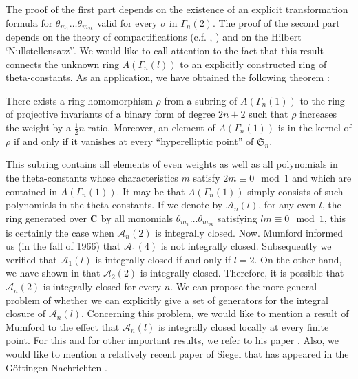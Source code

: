 The proof of the first part depends on the existence of an explicit transformation formula for $\theta_{m_{1}}\ldots\theta_{m_{2k}}$ valid for every $\sigma$ in $\Gamma_{n}(2)$. The proof of the second part depends on the theory of compactifications (c.f. \cite{art12-key1}, \cite{art12-key4}) and on the Hilbert `Nullstellensatz''. We would like to call attention to the fact that this result connects the unknown ring $A(\Gamma_{n}(l))$ to an explicitly constructed ring of theta-constants. As an application, we have obtained the following theorem \cite{art12-key12}:

There exists a ring homomorphism $\rho$ from a subring of $A(\Gamma_{n}(1))$ to the ring of projective invariants of a binary form of degree $2n+2$ such that $\rho$ increases the weight by a $\frac{1}{2}n$ ratio. Moreover, an element of $A(\Gamma_{n}(1))$ is in the kernel of $\rho$ if and only if it vanishes at every ``hyperelliptic point'' of $\mathfrak{S}_{n}$.

This subring contains all elements of even weights as well as all polynomials in the theta-constants whose characteristics $m$ satisfy $2m\equiv 0\mod 1$ and which are contained in $A(\Gamma_{n}(1))$. It may be that $A(\Gamma_{n}(1))$ simply consists of such polynomials in the theta-constants. If we denote by $\mathscr{A}_{n}(l)$, for any even $l$, the ring generated over $\mathbf{C}$ by all monomials $\theta_{m_{1}}\ldots\theta_{m_{2k}}$ satisfying $lm\equiv 0\mod 1$, this is certainly the case when $\mathscr{A}_{n}(2)$ is integrally closed. Now. Mumford informed us (in the fall of 1966) that $\mathscr{A}_{1}(4)$ is not integrally closed. Subsequently we verified that $\mathscr{A}_{1}(l)$ is integrally closed if and only if $l=2$. On the other hand, we have shown in \cite{art12-key8} that $\mathscr{A}_{2}(2)$ is integrally closed. Therefore, it is possible that $\mathscr{A}_{n}(2)$ is integrally closed for every $n$. We can propose the more general problem of whether we can explicitly give a set of generators for the integral closure of $\mathscr{A}_{n}(l)$. Concerning this problem, we would like to mention a result of Mumford to the effect that $\mathscr{A}_{n}(l)$ is integrally closed locally at every finite point. For this and for other important results, we refer to his paper \cite{art12-key16}. Also, we would like to mention a relatively recent paper of Siegel that has appeared in the G\"ottingen Nachrichten \cite[III]{art12-key22}.


